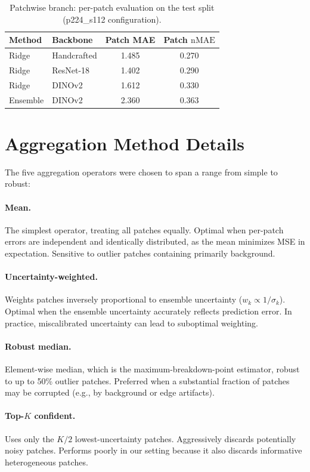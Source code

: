 \documentclass[11pt,a4paper]{article}
\newcommand{\nMAE}{\mathrm{nMAE}}
\begin{document}
\begin{table}[h]
\centering
\caption{Patchwise branch: per-patch evaluation on the test split (p224\_s112 configuration).}
\label{tab:pa_full}
\begin{tabular}{llcc}
\toprule
Method & Backbone & Patch MAE & Patch $\nMAE$ \\
\midrule
Ridge & Handcrafted & 1.485 & 0.270 \\
Ridge & ResNet-18 & 1.402 & 0.290 \\
Ridge & DINOv2 & 1.612 & 0.330 \\
Ensemble & DINOv2 & 2.360 & 0.363 \\
\bottomrule
\end{tabular}
\end{table}


\section{Aggregation Method Details}
\label{app:aggregation}

The five aggregation operators were chosen to span a range from simple to robust:

\paragraph{Mean.} The simplest operator, treating all patches equally. Optimal when per-patch errors are independent and identically distributed, as the mean minimizes MSE in expectation. Sensitive to outlier patches containing primarily background.

\paragraph{Uncertainty-weighted.} Weights patches inversely proportional to ensemble uncertainty ($w_k \propto 1/\sigma_k$). Optimal when the ensemble uncertainty accurately reflects prediction error. In practice, miscalibrated uncertainty can lead to suboptimal weighting.

\paragraph{Robust median.} Element-wise median, which is the maximum-breakdown-point estimator, robust to up to 50\% outlier patches. Preferred when a substantial fraction of patches may be corrupted (e.g., by background or edge artifacts).

\paragraph{Top-$K$ confident.} Uses only the $K/2$ lowest-uncertainty patches. Aggressively discards potentially noisy patches. Performs poorly in our setting because it also discards informative heterogeneous patches.
\end{document}
